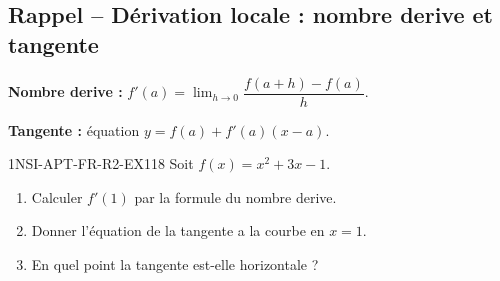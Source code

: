

\subsection*{Rappel -- Dérivation locale : nombre derive et tangente}

\textbf{Nombre derive :} $f'(a) = \lim_{h \to 0} \dfrac{f(a+h) - f(a)}{h}$.

\textbf{Tangente :} équation $y = f(a) + f'(a)(x - a)$.

\begin{exercice}{1NSI-APT-FR-R2-EX1}{1}{8}
Soit $f(x) = x^2 + 3x - 1$.
\begin{enumerate}
  \item Calculer $f'(1)$ par la formule du nombre derive.
  \item Donner l'équation de la tangente a la courbe en $x = 1$.
  \item En quel point la tangente est-elle horizontale ?
\end{enumerate}
\end{exercice}

